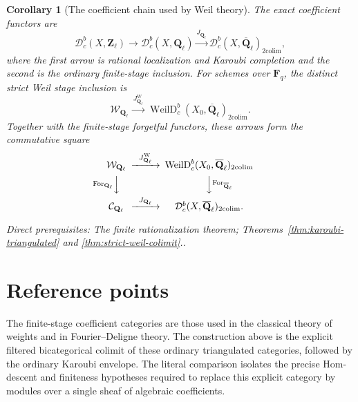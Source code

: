 \documentclass[10pt]{article}
\newtheorem{corollary}[theorem]{Corollary}
\theoremstyle{definition}
\newcommand{\Ql}{\mathbf Q_\ell}
\newcommand{\Qlb}{\overline{\mathbf Q}_\ell}
\newcommand{\Zl}{\mathbf Z_\ell}
\newcommand{\Dbc}{\mathcal D^b_c}
\newcommand{\depends}[1]{\par\smallskip\noindent\textit{Direct prerequisites:} #1.}
\begin{document}
\begin{corollary}[The coefficient chain used by Weil theory]
The exact coefficient functors are
\[
 \Dbc(X,\Zl)\longrightarrow\Dbc(X,\Ql)
 \xrightarrow{J_{\Ql}}\Dbc(X,\Qlb)_{\mathrm{2colim}},
\]
where the first arrow is rational localization and Karoubi completion and
the second is the ordinary finite-stage inclusion.  For schemes over
$\mathbf F_q$, the distinct strict Weil stage inclusion is
\[
 \mathcal W_{\Ql}\xrightarrow{\ J^{\mathrm W}_{\Ql}\ }
 \operatorname{WeilD}^b_c(X_0,\Qlb)_{\mathrm{2colim}}.
\]
Together with the finite-stage forgetful functors, these arrows form the
commutative square
\[
\begin{CD}
 \mathcal W_{\Ql} @>{J^{\mathrm W}_{\Ql}}>>
 \operatorname{WeilD}^b_c(X_0,\Qlb)_{\mathrm{2colim}}\\
 @V{\operatorname{For}_{\Ql}}VV @VV{\operatorname{For}_{\Qlb}}V\\
 \mathcal C_{\Ql} @>{J_{\Ql}}>>
 \Dbc(X,\Qlb)_{\mathrm{2colim}}.
\end{CD}
\]
\depends{The finite rationalization theorem; Theorems~\ref{thm:karoubi-triangulated}
and \ref{thm:strict-weil-colimit}.}
\end{corollary}

\section{Reference points}

The finite-stage coefficient categories are those used in the classical
theory of weights and in Fourier--Deligne theory.  The construction above
is the explicit filtered bicategorical colimit of these ordinary
triangulated categories, followed by the ordinary Karoubi envelope.  The
literal comparison isolates the precise Hom-descent and finiteness
hypotheses required to replace this explicit category by modules over a
single sheaf of algebraic coefficients.
\end{document}
